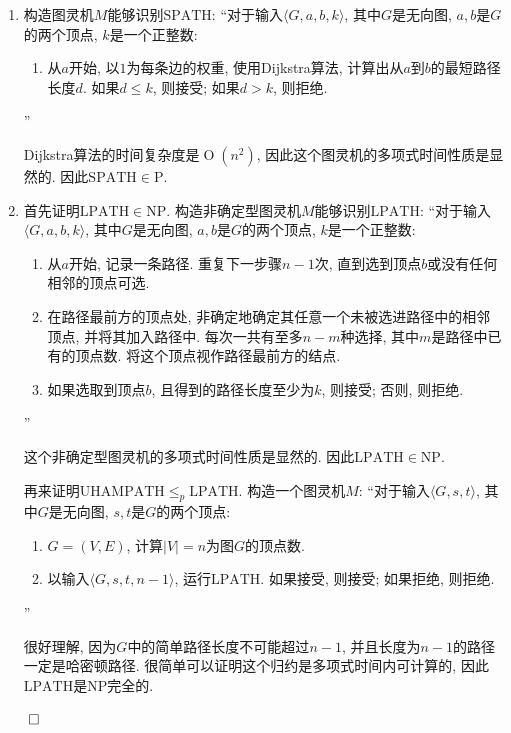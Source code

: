 \documentclass[UTF8]{report}
\renewcommand{\P}{\mathbb{P}} %
\renewenvironment{proof}{{\setlength{\parskip}{7pt}\noindent\hskip 2em \bf 证明 \quad}}{\hfill$\qed$\par}
\newcommand{\NP}{\mathrm{NP}}
\renewcommand{\P}{\mathrm{P}}
\newcommand{\SPATH}{\mathrm{SPATH}}
\newcommand{\LPATH}{\mathrm{LPATH}}
\newcommand{\UHAMPATH}{\mathrm{UHAMPATH}}
\begin{document}
\begin{proof}
    \begin{enumerate}[label=\alph*.]
        \item 构造图灵机$M$能够识别$\SPATH$:
        ``对于输入$\langle G,a,b,k \rangle$, 其中$G$是无向图, $a,b$是$G$的两个顶点, $k$是一个正整数:
        \begin{enumerate}
            \item 从$a$开始, 以$1$为每条边的权重, 使用Dijkstra算法, 计算出从$a$到$b$的最短路径长度$d$. 如果$d \leq k$, 则接受; 如果$d > k$, 则拒绝.
        \end{enumerate}
        ''

        Dijkstra算法的时间复杂度是$\operatorname*{O}(n^2)$, 因此这个图灵机的多项式时间性质是显然的. 因此$\SPATH \in \P$.

        \item 首先证明$\LPATH \in \NP$. 构造非确定型图灵机$M$能够识别$\LPATH$:
        ``对于输入$\langle G,a,b,k \rangle$, 其中$G$是无向图, $a,b$是$G$的两个顶点, $k$是一个正整数:
        \begin{enumerate}
            \item 从$a$开始, 记录一条路径. 重复下一步骤$n - 1$次, 直到选到顶点$b$或没有任何相邻的顶点可选.
            \item 在路径最前方的顶点处, 非确定地确定其任意一个未被选进路径中的相邻顶点, 并将其加入路径中. 每次一共有至多$n-m$种选择, 其中$m$是路径中已有的顶点数. 将这个顶点视作路径最前方的结点.
            \item 如果选取到顶点$b$, 且得到的路径长度至少为$k$, 则接受; 否则, 则拒绝.
        \end{enumerate}
        ''

        这个非确定型图灵机的多项式时间性质是显然的. 因此$\LPATH \in \NP$.

        再来证明$\UHAMPATH \leq_p \LPATH$. 构造一个图灵机$M$: ``对于输入$\langle G, s, t \rangle$, 其中$G$是无向图, $s, t$是$G$的两个顶点:
        \begin{enumerate}
            \item $G=(V, E)$, 计算$|V| = n$为图$G$的顶点数.
            \item 以输入$\langle G, s, t, n-1 \rangle$, 运行$\LPATH$. 如果接受, 则接受; 如果拒绝, 则拒绝.
        \end{enumerate}
        ''

        很好理解, 因为$G$中的简单路径长度不可能超过$n-1$, 并且长度为$n-1$的路径一定是哈密顿路径. 很简单可以证明这个归约是多项式时间内可计算的, 因此$\LPATH$是$\NP$完全的.
    \end{enumerate}
\end{proof}
\end{document}
